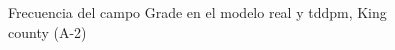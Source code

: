 \begin{figure}[H]
    \centering
    
    \caption{Frecuencia del campo Grade en el modelo real y tddpm, King county (A-2)}
    \label{frecuency-tddpm-grade}
\end{figure}